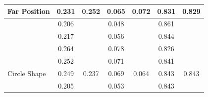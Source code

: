 \documentclass[conference]{IEEEtran}
\begin{document}
\begin{table}[]
\begin{tabular}{|l|cc|cc|cc|}
  \multirow{-5}{*}{Far Position}                & \multicolumn{1}{c|}{\cellcolor[HTML]{FFFFFF}0.231} & \multirow{-5}{*}{\cellcolor[HTML]{FFFFFF}0.252} & \multicolumn{1}{c|}{\cellcolor[HTML]{FFFFFF}0.065} & \multirow{-5}{*}{\cellcolor[HTML]{FFFFFF}0.072} & \multicolumn{1}{c|}{\cellcolor[HTML]{FFFFFF}0.831} & \multirow{-5}{*}{\cellcolor[HTML]{FFFFFF}0.829} \\ \hline
                                                      & \multicolumn{1}{c|}{\cellcolor[HTML]{FFFFFF}0.206} & \cellcolor[HTML]{FFFFFF}                         & \multicolumn{1}{c|}{\cellcolor[HTML]{FFFFFF}0.048} & \cellcolor[HTML]{FFFFFF}                           & \multicolumn{1}{c|}{\cellcolor[HTML]{FFFFFF}0.861} & \cellcolor[HTML]{FFFFFF}                        \\ \cline{2-2} \cline{4-4} \cline{6-6}
                                                      & \multicolumn{1}{c|}{\cellcolor[HTML]{FFFFFF}0.217} & \cellcolor[HTML]{FFFFFF}                         & \multicolumn{1}{c|}{\cellcolor[HTML]{FFFFFF}0.056}  & \cellcolor[HTML]{FFFFFF}                           & \multicolumn{1}{c|}{\cellcolor[HTML]{FFFFFF}0.844} & \cellcolor[HTML]{FFFFFF}                        \\ \cline{2-2} \cline{4-4} \cline{6-6}
                                                      & \multicolumn{1}{c|}{\cellcolor[HTML]{FFFFFF}0.264} & \cellcolor[HTML]{FFFFFF}                         & \multicolumn{1}{c|}{\cellcolor[HTML]{FFFFFF}0.078} & \cellcolor[HTML]{FFFFFF}                           & \multicolumn{1}{c|}{\cellcolor[HTML]{FFFFFF}0.826} & \cellcolor[HTML]{FFFFFF}                        \\ \cline{2-2} \cline{4-4} \cline{6-6}
                                                      & \multicolumn{1}{c|}{\cellcolor[HTML]{FFFFFF}0.252} & \cellcolor[HTML]{FFFFFF}                         & \multicolumn{1}{c|}{\cellcolor[HTML]{FFFFFF}0.071} & \cellcolor[HTML]{FFFFFF}                           & \multicolumn{1}{c|}{\cellcolor[HTML]{FFFFFF}0.841} & \cellcolor[HTML]{FFFFFF}                        \\ \cline{2-2} \cline{4-4} \cline{6-6}
  \multirow{-5}{*}{Circle Shape} & \multicolumn{1}{c|}{\cellcolor[HTML]{FFFFFF}0.249} & \multirow{-5}{*}{\cellcolor[HTML]{FFFFFF}0.237} & \multicolumn{1}{c|}{\cellcolor[HTML]{FFFFFF}0.069} & \multirow{-5}{*}{\cellcolor[HTML]{FFFFFF}0.064} & \multicolumn{1}{c|}{\cellcolor[HTML]{FFFFFF}0.843} & \multirow{-5}{*}{\cellcolor[HTML]{FFFFFF}0.843} \\ \hline
                                                      & \multicolumn{1}{c|}{\cellcolor[HTML]{FFFFFF}0.205} & \cellcolor[HTML]{FFFFFF}                         & \multicolumn{1}{c|}{\cellcolor[HTML]{FFFFFF}0.053} & \cellcolor[HTML]{FFFFFF}                           & \multicolumn{1}{c|}{\cellcolor[HTML]{FFFFFF}0.843} & \cellcolor[HTML]{FFFFFF}                        \\ \cline{2-2} \cline{4-4} \cline{6-6}

\end{tabular}
\end{table}
\end{document}
